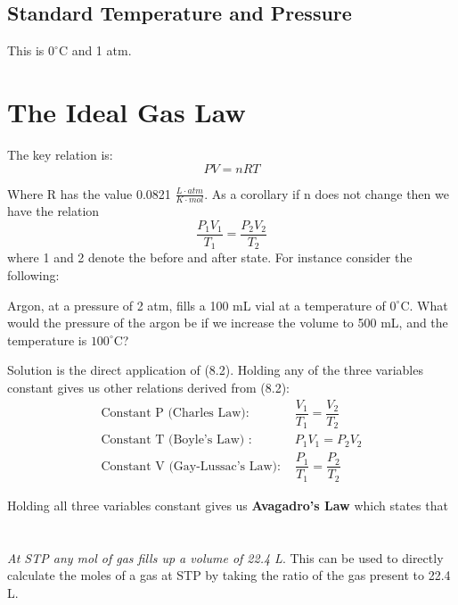 \documentclass[../GChemReview.tex]{subfiles}
\begin{document}
	\subsection{Standard Temperature and Pressure}
	
	This is $ 0^{\circ} $C and 1 atm.
	
	\section{The Ideal Gas Law}
	
	The key relation is:
	\begin{equation}
	\boxed{	PV = nRT}
	\end{equation}
	
	Where R has the value 0.0821 $ \tfrac{L\cdot atm}{K\cdot mol} $. As a corollary if n does not change then we have the relation
	\begin{equation}
		\dfrac{P_{1}V_{1}}{T_{1}}=\dfrac{P_{2}V_{2}}{T_{2}}
	\end{equation}	
	where 1 and 2 denote the before and after state. For instance consider the following:
	\begin{problem*}
		Argon, at a pressure of 2 atm, fills a 100 mL vial at a temperature of $ 0^{\circ} $C. What would the pressure of the argon be if we increase the volume to 500 mL, and the temperature is $ 100^{\circ} $C?
	\end{problem*}
	Solution is the direct application of (8.2). Holding any of the three variables constant gives us other relations derived from (8.2):
	\begin{align}
		\text{Constant P (Charles Law): } &\dfrac{V_{1}}{T_{1}} = \dfrac{V_{2}}{T_{2}}\\
		\text{Constant T (Boyle's Law) : } &P_{1}V_{1}=P_{2}V_{2}\\
		\text{Constant V (Gay-Lussac's Law): } &\dfrac{P_{1}}{T_{1}} = \dfrac{P_{2}}{T_{2}}
	\end{align}
	
	Holding all three variables constant gives us \textbf{Avagadro's Law} which states that\\
	\hfil \\
	\hfil\\
	
	\emph{At STP any mol of gas fills up a volume of 22.4 L}. This can be used to directly calculate the moles of a gas at STP by taking the ratio of the gas present to 22.4 L.
	
\end{document}
